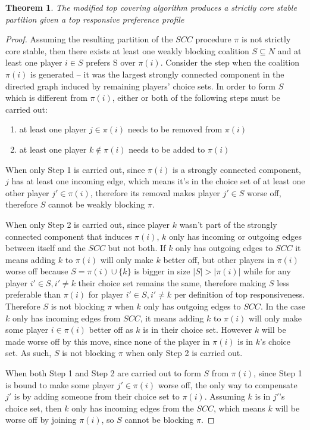 \documentclass[letterpaper]{article} %
\newtheorem{theorem}{Theorem}[section]
\theoremstyle{definition}
\begin{document}
\begin{theorem}
  The modified top covering algorithm produces a strictly core stable partition given a top responsive preference profile
\end{theorem}

\begin{proof}
Assuming the resulting partition of the $SCC$ procedure $\pi$ is not strictly core stable, then there exists at least one weakly blocking coalition $S \subseteq N$ and at least one player $i \in S$ prefers S over $\pi(i)$. Consider the step when the coalition $\pi(i)$ is generated – it was the largest strongly connected component in the directed graph induced by remaining players' choice sets. In order to form $S$ which is different from $\pi(i)$, either or both of the following steps must be carried out:

\begin{enumerate}
  \item at least one player $j \in \pi(i)$ needs to be removed from $\pi(i)$
  \item at least one player $k \notin \pi(i)$ needs to be added to $\pi(i)$
\end{enumerate}

When only Step 1 is carried out, since $\pi(i)$ is a strongly connected component, $j$ has at least one incoming edge, which means it's in the choice set of at least one other player $j' \in \pi(i)$, therefore its removal makes player $j' \in S$ worse off, therefore $S$ cannot be weakly blocking $\pi$.

When only Step 2 is carried out, since player $k$ wasn't part of the strongly connected component that induces $\pi(i)$, $k$ only has incoming or outgoing edges between itself and the $SCC$ but not both. If $k$ only has outgoing edges to $SCC$ it means adding $k$ to $\pi(i)$ will only make $k$ better off, but other players in $\pi(i)$ worse off because $S = \pi(i) \cup \{k\}$ is bigger in size $|S| > |\pi(i)|$ while for any player $i' \in S, i' \neq k$ their choice set remains the same, therefore making $S$ less preferable than $\pi(i)$ for player $i' \in S, i' \neq k$ per definition of top responsiveness. Therefore $S$ is not blocking $\pi$ when $k$ only has outgoing edges to $SCC$. In the case $k$ only has incoming edges from $SCC$, it means adding $k$ to $\pi(i)$ will only make some player $i \in \pi(i)$ better off as $k$ is in their choice set. 
However $k$ will be made worse off by this move, since none of the player in $\pi(i)$ is in $k$'s choice set. As such, $S$ is not blocking $\pi$ when only Step 2 is carried out.

When both Step 1 and Step 2 are carried out to form $S$ from $\pi(i)$, since Step 1 is bound to make some player $j' \in \pi(i)$ worse off, the only way to compensate $j'$ is by adding someone from their choice set to $\pi(i)$. Assuming $k$ is in $j'$'s choice set, then $k$ only has incoming edges from the $SCC$, which means $k$ will be worse off by joining $\pi(i)$, so $S$ cannot be blocking $\pi$.
\end{proof}
\end{document}
